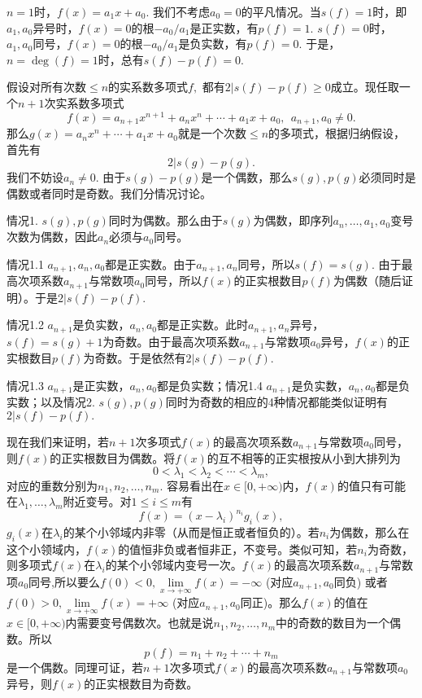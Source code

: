 $n = 1$时，$f(x) = a_1 x + a_0.$ 我们不考虑$a_0 = 0$的平凡情况。当$s(f) = 1$时，即$a_1, a_0$异号时，$f(x) = 0$的根$-a_0 / a_1$是正实数，有$p(f) = 1.$ $s(f) = 0$时，$a_1, a_0$同号，$f(x) = 0$的根$-a_0 / a_1$是负实数，有$p(f) = 0.$ 于是，$n = \deg(f) = 1$时，总有$s(f) - p(f) = 0.$

假设对所有次数$\leqslant n$的实系数多项式$f,$ 都有$2 | s(f) - p(f) \geqslant 0$成立。现任取一个$n+1$次实系数多项式
$$f(x) = a_{n+1}x^{n+1} + a_nx^n + \cdots + a_1x + a_0, ~~ a_{n+1}, a_0 \neq 0.$$
那么$g(x) = a_nx^n + \cdots + a_1x + a_0$就是一个次数$\leqslant n$的多项式，根据归纳假设，首先有
$$2 | s(g) - p(g).$$
我们不妨设$a_n \neq 0.$ 由于$s(g) - p(g)$是一个偶数，那么$s(g), p(g)$必须同时是偶数或者同时是奇数。我们分情况讨论。

情况1. $s(g), p(g)$同时为偶数。那么由于$s(g)$为偶数，即序列$a_n, \ldots, a_1, a_0$变号次数为偶数，因此$a_n$必须与$a_0$同号。

情况1.1 $a_{n+1}, a_n, a_0$都是正实数。由于$a_{n+1}, a_n$同号，所以$s(f) = s(g).$ 由于最高次项系数$a_{n+1}$与常数项$a_0$同号，所以$f(x)$的正实根数目$p(f)$为偶数（随后证明）。于是$2 | s(f) - p(f).$

情况1.2 $a_{n+1}$是负实数，$a_n, a_0$都是正实数。此时$a_{n+1}, a_n$异号，$s(f) = s(g) + 1$为奇数。由于最高次项系数$a_{n+1}$与常数项$a_0$异号，$f(x)$的正实根数目$p(f)$为奇数。于是依然有$2 | s(f) - p(f).$

情况1.3 $a_{n+1}$是正实数，$a_n, a_0$都是负实数；情况1.4 $a_{n+1}$是负实数，$a_n, a_0$都是负实数；以及情况2. $s(g), p(g)$同时为奇数的相应的4种情况都能类似证明有$2 | s(f) - p(f).$

现在我们来证明，若$n+1$次多项式$f(x)$的最高次项系数$a_{n+1}$与常数项$a_0$同号，则$f(x)$的正实根数目为偶数。将$f(x)$的互不相等的正实根按从小到大排列为
$$0 < \lambda_1 < \lambda_2 < \cdots < \lambda_m,$$
对应的重数分别为$n_1, n_2, \ldots, n_m.$ 容易看出在$x \in [0, +\infty)$内，$f(x)$的值只有可能在$\lambda_1, \ldots, \lambda_m$附近变号。对$1 \leqslant i \leqslant m$有
$$f(x) = (x - \lambda_i)^{n_i} g_i(x),$$
$g_i(x)$在$\lambda_i$的某个小邻域内非零（从而是恒正或者恒负的）。若$n_i$为偶数，那么在这个小领域内，$f(x)$的值恒非负或者恒非正，不变号。类似可知，若$n_i$为奇数，则多项式$f(x)$在$\lambda_i$的某个小邻域内变号一次。$f(x)$的最高次项系数$a_{n+1}$与常数项$a_0$同号,所以要么$f(0) < 0, \lim\limits_{x\to+\infty} f(x) = -\infty$ (对应$a_{n+1}, a_0$同负) 或者$f(0) > 0, \lim\limits_{x\to+\infty} f(x) = +\infty$ (对应$a_{n+1}, a_0$同正)。那么$f(x)$的值在$x \in [0, +\infty)$内需要变号偶数次。也就是说$n_1, n_2, \ldots, n_m$中的奇数的数目为一个偶数。所以
$$p(f) = n_1 + n_2 + \cdots + n_m$$
是一个偶数。同理可证，若$n+1$次多项式$f(x)$的最高次项系数$a_{n+1}$与常数项$a_0$异号，则$f(x)$的正实根数目为奇数。

